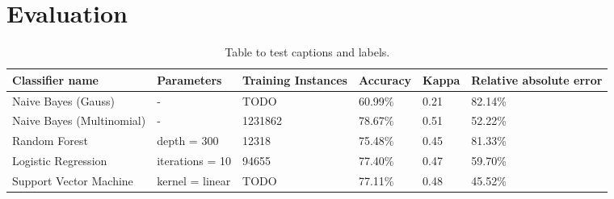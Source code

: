 \section{Evaluation}
\begin{table}[h!]
\centering
\caption{Table to test captions and labels.}
\begin{tabular}{ |p{3cm}||p{3cm}|p{2cm}|p{2cm}|p{2cm}|p{2cm}|  }
 \hline
 Classifier name &          Parameters &             Training Instances &    Accuracy &      Kappa &     Relative absolute error \\
 \hline
 Naive Bayes (Gauss)        &-&            TODO&                 60.99\%&        0.21&       82.14\%\\
  \hline
 Naive Bayes (Multinomial)  &-&                     1231862&                78.67\%&        0.51&       52.22\%\\
  \hline
 Random Forest              &depth = 300&            12318&                 75.48\%&        0.45&       81.33\%\\
  \hline
 Logistic Regression        &iterations = 10&            94655&                 77.40\%&        0.47&       59.70\%\\
  \hline
 Support Vector Machine     &kernel = linear&            TODO&                 77.11\%&        0.48&       45.52\%\\
 \hline
\end{tabular}
\label{tab:evaluations}
\end{table}












